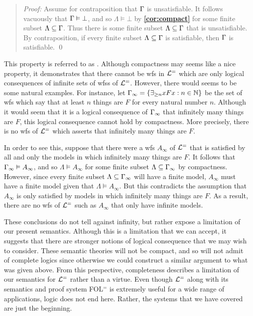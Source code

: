 \begin{quote} 
  \textit{Proof:} 
  Assume for contraposition that $\Gamma$ is unsatisfiable. 
  It follows vacuously that $\Gamma\vDash\bot$, and so $\Lambda\vDash\bot$ by \textbf{\ref{cor:compact}} for some finite subset $\Lambda\subseteq\Gamma$.
  Thus there is some finite subset $\Lambda\subseteq\Gamma$ that is unsatisfiable. 
  By contraposition, if every finite subset $\Lambda\subseteq\Gamma$ is satisfiable, then $\Gamma$ is satisfiable. 
  \qed
\end{quote}


This property is referred to as .
Although compactness may seems like a nice property, it demonstrates that there cannot be wfs in $\mathcal{L}^{=}$ which are only logical consequences of infinite sets of wfss of $\mathcal{L}^{=}$.
However, there would seems to be some natural examples.
For instance, let $\Gamma_\infty=\lbrace\exists_{\geq n}xFx:n\in\mathbb{N}\rbrace$ be the set of wfs which say that at least $n$ things are $F$ for every natural number $n$. 
Although it would seem that it is a logical consequence of $\Gamma_\infty$ that infinitely many things are $F$, this logical consequence cannot hold by compactness.
More precisely, there is no wfs of $\mathcal{L}^{=}$ which asserts that infinitely many things are $F$.

In order to see this, suppose that there were a wfs $A_\infty$ of $\mathcal{L}^{=}$ that is satisfied by all and only the models in which infinitely many things are $F$.
It follows that $\Gamma_\infty\vDash A_\infty$, and so $\Lambda\vDash A_\infty$ for some finite subset $\Lambda\subseteq\Gamma_\infty$ by compactness.
However, since every finite subset $\Lambda\subseteq\Gamma_\infty$ will have a finite model, $A_\infty$ must have a finite model given that $\Lambda\vDash A_\infty$. 
But this contradicts the assumption that $A_\infty$ is only satisfied by models in which infinitely many things are $F$.
As a result, there are no wfs of $\mathcal{L}^{=}$ such as $A_\infty$ that only have infinite models. %

These conclusions do not tell against infinity, but rather expose a limitation of our present semantics.
Although this is a limitation that we can accept, it suggests that there are stronger notions of logical consequence that we may wish to consider.
These semantic theories will not be compact, and so will not admit of complete logics since otherwise we could construct a similar argument to what was given above.
From this perspective, completeness describes a limitation of our semantics for $\mathcal{L}^{=}$ rather than a virtue.
Even though $\mathcal{L}^{=}$ along with its semantics and proof system FOL$^=$ is extremely useful for a wide range of applications, logic does not end here. 
Rather, the systems that we have covered are just the beginning.


